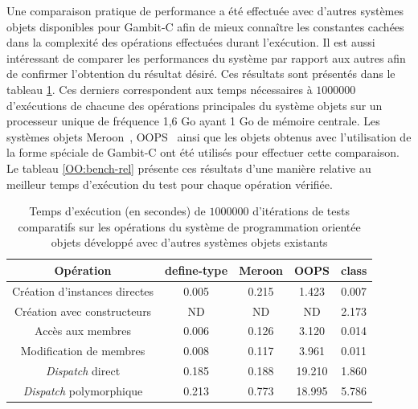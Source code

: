 \documentclass[12pt,twoside,letterpaper,francais]{book}
\newcommand{\scheme}[1]{\selectlanguage{english}{\tt #1}\selectlanguage{french}}
\begin{document}
Une comparaison pratique de performance a été effectuée avec d'autres
systèmes objets disponibles pour Gambit-C afin de mieux connaître les
constantes cachées dans la complexité des opérations effectuées durant
l'exécution. Il est aussi intéressant de comparer les performances du
système par rapport aux autres afin de confirmer l'obtention du
résultat désiré. Ces résultats sont présentés dans le tableau
\ref{OO:bench}. Ces derniers correspondent aux temps nécessaires à $1
000 000$ d'exécutions de chacune des opérations principales du système
objets sur un processeur unique de fréquence 1,6 Go ayant 1 Go de
mémoire centrale. Les systèmes objets Meroon~\cite{MEROON},
OOPS~\cite{OOPS} ainsi que les objets obtenus avec l'utilisation de la
forme spéciale \scheme{define-type} de Gambit-C ont été utilisés pour
effectuer cette comparaison. Le tableau \ref{OO:bench-rel} présente
ces résultats d'une manière relative au meilleur temps d'exécution du
test pour chaque opération vérifiée.

\begin{table}
  \center
  \begin{tabular}{ccccc}
    \hline
    Opération & define-type & Meroon & OOPS & class \\
    \hline \hline
    Création d'instances directes           & 0.005 & 0.215 & 1.423 & 0.007\\
    Création avec constructeurs             & ND    & ND    & ND    & 2.173\\
    Accès aux membres                       & 0.006 & 0.126 & 3.120 & 0.014\\
    Modification de membres                 & 0.008 & 0.117 & 3.961 & 0.011\\
    \textit{Dispatch} direct                & 0.185 & 0.188 & 19.210 & 1.860\\
    \textit{Dispatch} polymorphique         & 0.213 & 0.773 & 18.995 & 5.786\\
    \hline
  \end{tabular}
  \caption{Temps d'exécution (en secondes) de $1 000 000$ d'itérations
    de tests comparatifs sur les opérations du système de
    programmation orientée objets développé avec d'autres systèmes
    objets existants}
  \label{OO:bench}
\end{table}
\end{document}
